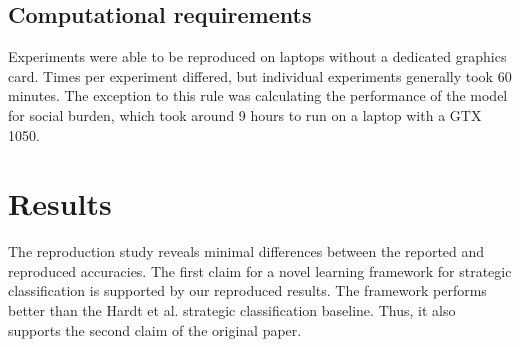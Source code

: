 
\subsection{Computational requirements}
Experiments were able to be reproduced on laptops without a dedicated graphics card. Times per experiment differed, but individual experiments generally took 60 minutes. The exception to this rule was calculating the performance of the model for social burden, which took around 9 hours to run on a laptop with a GTX 1050.

\section{Results}
\label{sec:results}
The reproduction study reveals minimal differences between the reported and reproduced accuracies. The first claim for a novel learning framework for strategic classification is supported by our reproduced results. The framework performs better than the Hardt et al.\cite{hardt2016strategic} strategic classification baseline. Thus, it also supports the second claim of the original paper.

